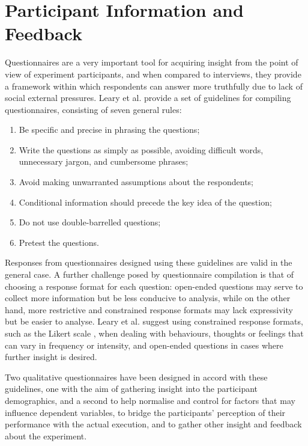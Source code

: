 \section{Participant Information and Feedback}
Questionnaires are a very important tool for acquiring insight from the point of view of experiment participants, and when compared to interviews, they provide a framework within which respondents can answer more truthfully due to lack of social external pressures. Leary et al. \cite{introductiontobehavioralresearchmethods} provide a set of guidelines for compiling questionnaires, consisting of seven general rules:
\begin{enumerate}
	\item Be specific and precise in phrasing the questions;
	\item Write the questions as simply as possible, avoiding difficult words, unnecessary jargon, and cumbersome phrases;
	\item Avoid making unwarranted assumptions about the respondents;
	\item Conditional information should precede the key idea of the question;
	\item Do not use double-barrelled questions;
	\item Pretest the questions.
\end{enumerate}
Responses from questionnaires designed using these guidelines are valid in the general case. A further challenge posed by questionnaire compilation is that of choosing a response format for each question: open-ended questions may serve to collect more information but be less conducive to analysis, while on the other hand, more restrictive and constrained response formats may lack expressivity but be easier to analyse. Leary et al. suggest using constrained response formats, such as the Likert scale \cite{likert1932technique}, when dealing with behaviours, thoughts or feelings that can vary in frequency or intensity, and open-ended questions in cases where further insight is desired. 

Two qualitative questionnaires have been designed in accord with these guidelines, one with the aim of gathering insight into the participant demographics, and a second to help normalise and control for factors that may influence dependent variables, to bridge the participants' perception of their performance with the actual execution, and to gather other insight and feedback about the experiment.


